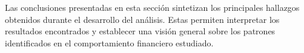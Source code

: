 

Las conclusiones presentadas en esta sección sintetizan los principales hallazgos obtenidos durante el desarrollo del análisis. Estas permiten interpretar los resultados encontrados y establecer una visión general sobre los patrones identificados en el comportamiento financiero estudiado.


